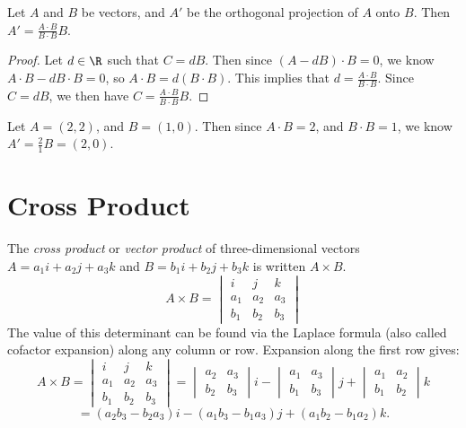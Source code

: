 \documentclass[12pt]{article}
\begin{document}
\begin{thm}\label{vector-projection}
    Let $A$ and $B$ be vectors, and $A'$ be the orthogonal projection of $A$ onto $B$. Then $A' = \frac{A \cdot B}{B \cdot B}B$.
\end{thm}

\begin{proof}
    Let $d \in \R$ such that $C = dB$. Then since $(A - dB) \cdot B = 0$, we know $A \cdot B - dB \cdot B = 0$, so $A \cdot B = d(B \cdot B)$. This implies that $d = \frac{A \cdot B}{B \cdot B}$. Since $C = dB$, we then have $C = \frac{A \cdot B}{B \cdot B}B$.
\end{proof}

\begin{exmp}
   Let $A = \left(2, 2\right)$, and $B = \left(1, 0\right)$. Then since $A \cdot B = 2$, and $B \cdot B = 1$, we know $A' = \frac{2}{1}B = \left(2, 0\right)$.
\end{exmp}

\section{Cross Product}

\begin{defn}
    The \emph{cross product} or \emph{vector product} of three-dimensional vectors $A = a_1i + a_2j + a_3k$ and $B = b_1i + b_2j + b_3k$ is written $A \times B$. \[A \times B = \begin{vmatrix}
        i & j & k \\ a_1 & a_2 & a_3 \\ b_1 & b_2 & b_3
    \end{vmatrix}\] The value of this determinant can be found via the Laplace formula (also called cofactor expansion) along any column or row. Expansion along the first row gives: \[A \times B =
    \begin{vmatrix}
        i & j & k \\ a_1 & a_2 & a_3 \\ b_1 & b_2 & b_3
    \end{vmatrix} =
    \begin{vmatrix}
        a_2 & a_3 \\ b_2 & b_3
    \end{vmatrix}i -
    \begin{vmatrix}
        a_1 & a_3 \\ b_1 & b_3
    \end{vmatrix}j +
    \begin{vmatrix}
        a_1 & a_2 \\ b_1 & b_2
    \end{vmatrix}k\] \[= (a_2b_3 - b_2a_3)i - (a_1b_3 - b_1a_3)j + (a_1b_2 - b_1a_2)k.\]
\end{defn}
\end{document}
